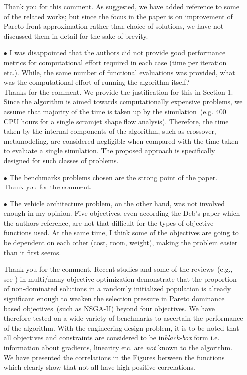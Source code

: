 \documentclass[onecolumn,10pt]{asme2ej}
\begin{document}
\begin{itemize}
{\color{blue}
Thank you for this comment. As suggested, we have added reference to some of the related works; but since the focus in the paper is on improvement of Pareto front approximation rather than choice of solutions, we have not discussed them in detail for the sake of brevity. \\
}


\item[$\bullet$] I was disappointed that the authors did not provide good performance metrics for computational effort required in each case (time per iteration etc.). While, the same number of functional evaluations was provided, what was the computational effort of running the algorithm itself? \\

{\color{blue} Thanks for the comment. We provide the justification for this in Section 1. Since the algorithm is aimed towards computationally expensive problems, we assume that majority of the time is taken up by the simulation~(e.g. 400 CPU hours for a single scramjet shape flow analysis). Therefore, the time taken by the internal components of the algorithm, such as crossover, metamodeling, are considered negligible when compared with the time taken to evaluate a single simulation. The proposed approach is specifically designed for such classes of problems.\\

}

\item[$\bullet$] 	The benchmarks problems chosen are the strong point of the paper. \\

{\color{blue} Thank you for the comment.} \\

\item[$\bullet$] 	The vehicle architecture problem, on the other hand, was not involved enough in my opinion. Five objectives, even according the Deb’s paper which the authors reference, are not that difficult for the types of objective functions used. At the same time, I think some of the objectives are going to be dependent on each other (cost, room, weight), making the problem easier than it first seems. \\

{\color{blue} Thank you for the comment. Recent studies and some of the reviews~(e.g., see \cite{ishibuchi2008evolutionary}) in multi/many-objective optimization demonstrate that the proportion of non-dominated solutions in a randomly initialized population is already significant enough to weaken the selection pressure in Pareto dominance based objectives~(such as NSGA-II) beyond four objectives. We have therefore tested on a wide variety of benchmarks to ascertain the performance of the algorithm. With the engineering design problem, it is to be noted that all objectives and constraints are considered to be in\emph{black-box} form i.e. information about gradients, linearity etc. are \emph{not} known to the algorithm. We have presented the correlations in the Figures between the functions which clearly show that not all have high positive correlations. 

}
\end{itemize}
\end{document}
